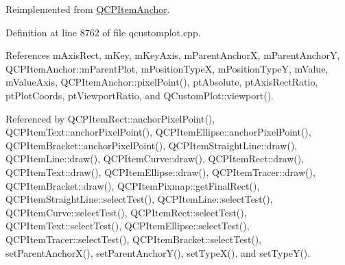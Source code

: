 Reimplemented from \hyperlink{class_q_c_p_item_anchor_ae92def8f9297c5d73f5806c586517bb3}{Q\+C\+P\+Item\+Anchor}.



Definition at line 8762 of file qcustomplot.\+cpp.



References m\+Axis\+Rect, m\+Key, m\+Key\+Axis, m\+Parent\+Anchor\+X, m\+Parent\+Anchor\+Y, Q\+C\+P\+Item\+Anchor\+::m\+Parent\+Plot, m\+Position\+Type\+X, m\+Position\+Type\+Y, m\+Value, m\+Value\+Axis, Q\+C\+P\+Item\+Anchor\+::pixel\+Point(), pt\+Absolute, pt\+Axis\+Rect\+Ratio, pt\+Plot\+Coords, pt\+Viewport\+Ratio, and Q\+Custom\+Plot\+::viewport().



Referenced by Q\+C\+P\+Item\+Rect\+::anchor\+Pixel\+Point(), Q\+C\+P\+Item\+Text\+::anchor\+Pixel\+Point(), Q\+C\+P\+Item\+Ellipse\+::anchor\+Pixel\+Point(), Q\+C\+P\+Item\+Bracket\+::anchor\+Pixel\+Point(), Q\+C\+P\+Item\+Straight\+Line\+::draw(), Q\+C\+P\+Item\+Line\+::draw(), Q\+C\+P\+Item\+Curve\+::draw(), Q\+C\+P\+Item\+Rect\+::draw(), Q\+C\+P\+Item\+Text\+::draw(), Q\+C\+P\+Item\+Ellipse\+::draw(), Q\+C\+P\+Item\+Tracer\+::draw(), Q\+C\+P\+Item\+Bracket\+::draw(), Q\+C\+P\+Item\+Pixmap\+::get\+Final\+Rect(), Q\+C\+P\+Item\+Straight\+Line\+::select\+Test(), Q\+C\+P\+Item\+Line\+::select\+Test(), Q\+C\+P\+Item\+Curve\+::select\+Test(), Q\+C\+P\+Item\+Rect\+::select\+Test(), Q\+C\+P\+Item\+Text\+::select\+Test(), Q\+C\+P\+Item\+Ellipse\+::select\+Test(), Q\+C\+P\+Item\+Tracer\+::select\+Test(), Q\+C\+P\+Item\+Bracket\+::select\+Test(), set\+Parent\+Anchor\+X(), set\+Parent\+Anchor\+Y(), set\+Type\+X(), and set\+Type\+Y().


